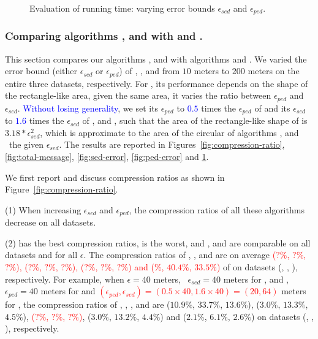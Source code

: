 {\begin{figure}[tb!]
	\vspace{-1ex}
	\caption{\small Evaluation of running time: varying error bounds $\epsilon_{sed}$ and $\epsilon_{ped}$.}
	\label{fig:running-time}
	\vspace{-1ex}
\end{figure}


\subsubsection{Comparing algorithms \bitt, \sitt and \citt with \ldrh and \grts.}
This section compares our algorithms \citt, \sitt and \bitt with algorithms \ldrh and \grts.
We varied the error bound (either $\epsilon_{sed}$ or $\epsilon_{ped}$) of \citt, \sitt, \ldrh and \grts from $10$ meters to $200$ meters on the entire three datasets, respectively. 
{For \bitt, its performance depends on the shape of the rectangle-like area, \ie given the same area, it varies \wrt the ratio between $\epsilon_{ped}$ and $\epsilon_{sed}$. \textcolor{blue}{Without losing generality}, we set its $\epsilon_{ped}$ to \textcolor{blue}{$0.5$} times the $\epsilon_{ped}$ of \sitt and its $\epsilon_{sed}$ to \textcolor{blue}{$1.6$} times the $\epsilon_{sed}$ of \citt, \grts and \ldrh, such that the area of the rectangle-like shape of \bitt is $3.18*\epsilon_{sed}^2$, which is approximate to the area of the circular of algorithms \citt, \ldrh and \grts~\wrt the given $\epsilon_{sed}$.}
%
The results are reported in Figures~\ref{fig:compression-ratio}, \ref{fig:total-message}, \ref{fig:sed-error}, \ref{fig:ped-error} and \ref{fig:running-time}.


 We first report and discuss compression ratios as shown in Figure~\ref{fig:compression-ratio}.

\ni (1) When increasing $\epsilon_{sed}$ and $\epsilon_{ped}$, the compression ratios of all these algorithms decrease on all datasets.

\ni (2) \sitt has the best compression ratios, \ldrh is the worst, and \grts, \citt and \bitt are comparable on all datasets and for all $\epsilon$.
The compression ratios of \grts, \bitt,  \citt and \sitt are on average \textcolor{red}{($?\%$, $?\%$, $?\%$), ($?\%$, $?\%$, $?\%$), ($?\%$, $?\%$, $?\%$) and ($\%$, $40.4\%$, $33.5\%$)} of \ldrh on datasets (\mopsi, \sercar, \geolife), respectively.
For example, when $\epsilon = 40$ meters, \ie~$\epsilon_{sed} = 40$ meters for \ldrh, \grts and \citt, $\epsilon_{ped} = 40$ meters for \sitt and \textcolor{red}{$(\epsilon_{ped}, \epsilon_{sed}) = (0.5\times 40, 1.6\times 40)=(20, 64)$} meters for \bitt, the compression ratios of \ldrh, \grts, \bitt, \citt and \sitt are
{($10.9\%$, $33.7\%$, $13.6\%$), ($3.0\%$, $13.3\%$, $4.5\%$), \textcolor{red}{($?\%$, $?\%$, $?\%$)}, ($3.0\%$, $13.2\%$, $4.4\%$) and ($2.1\%$, $6.1\%$, $2.6\%$)} on  {datasets (\mopsi, \sercar, \geolife)}, respectively. 

}
